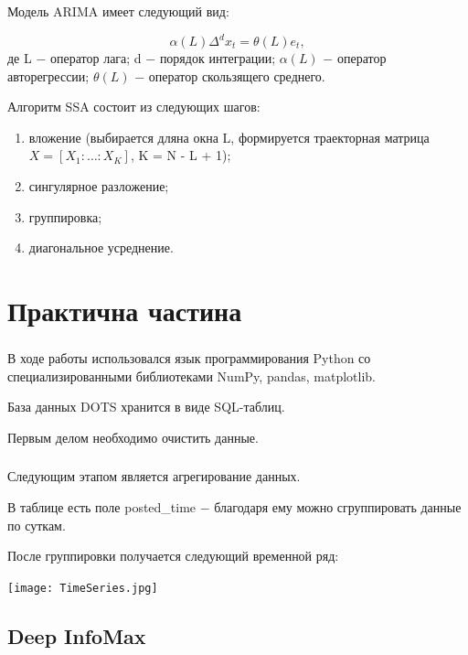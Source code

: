 \documentclass[c]{beamer}
\begin{document}
\begin{frame}
	\frametitle{\insertsection}
	Модель ARIMA имеет следующий вид:

	\[
		\alpha(L)\Delta^{d}x_{t} = \theta(L)e_{t},
	\]
	\noindent де L $-$ оператор лага; d $-$ порядок интеграции; $\alpha(L)$ $-$ оператор авторегрессии; $\theta(L)$ $-$ оператор скользящего среднего.\pause

	Алгоритм SSA состоит из следующих шагов:\pause

	\begin{enumerate}
		\item вложение (выбирается дляна окна L, формируется траекторная матрица $X = [X_{1} : \dots: X_{K}]$, K = N - L + 1);\pause
		\item сингулярное разложение;\pause
		\item группировка;\pause
		\item диагональное усреднение.
	\end{enumerate}	
	
\end{frame}

\section{Практична частина}

\begin{frame}
	\frametitle{\insertsection}
	
	В ходе работы использовался язык программирования Python со специализированными библиотеками NumPy, pandas, matplotlib.\pause
	
	База данных DOTS хранится в виде SQL-таблиц.\pause
	
	Первым делом необходимо очистить данные.	
	
\end{frame}

\begin{frame}
	\frametitle{\insertsection}
	
	Следующим этапом является агрегирование данных.\pause
	
	В таблице есть поле posted\_time $-$ благодаря ему можно сгруппировать данные по суткам.\pause
	
	После группировки получается следующий временной ряд:	
	
  	\centering\texttt{[image: TimeSeries.jpg]}

\end{frame}

\subsection{Deep InfoMax}
\end{document}
